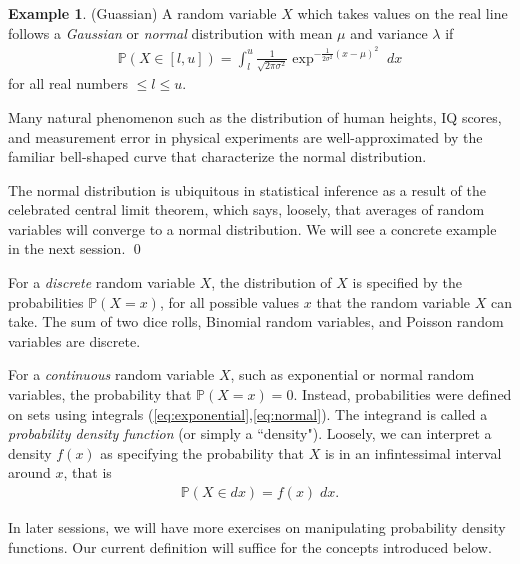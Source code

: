 \documentclass[11pt]{article}
\theoremstyle{definition}
\newtheorem{example}[theorem]{Example}
\renewcommand{\P}{\mathbb{P}}
\begin{document}
\begin{example}(Guassian)
A random variable $X$ which takes values on the real line follows a
\textit{Gaussian} or \textit{normal} distribution with mean $\mu$ and variance
$\lambda$ if
\begin{align}
  \P(X \in [l, u]) =
  \int_{l}^u \frac{1}{\sqrt{2\pi\sigma^2}}
  \exp^{-\frac{1}{2\sigma^2}(x - \mu)^2} \; dx
  \label{eq:normal}
\end{align}
for all real numbers $\leq l \leq u$.

Many natural phenomenon such as the distribution of human heights, IQ scores, and
measurement error in physical experiments are well-approximated by the familiar
bell-shaped curve that characterize the normal distribution.

The normal distribution is ubiquitous in statistical inference as a result of
the celebrated central limit theorem, which says, loosely, that averages
of random variables will converge to a normal distribution. We will see
a concrete example in the next session.
\qed
\end{example}

For a \textit{discrete} random variable $X$, the distribution of $X$ is specified
by the probabilities $\P(X = x)$, for all possible values $x$ that the random variable $X$
can take. The sum of two dice rolls, Binomial random variables, and Poisson random variables
are discrete.

For a \textit{continuous} random variable $X$, such as exponential or normal random variables,
the probability that $\P(X = x) = 0$. Instead, probabilities were defined on sets
using integrals (\ref{eq:exponential},\ref{eq:normal}).
The integrand is called a \textit{probability density function} (or simply a ``density"). Loosely,
we can interpret a density $f(x)$ as specifying the probability that $X$ is in an infintessimal
interval around $x$, that is
\begin{align*}
  \P(X \in dx) = f(x)\;dx.
\end{align*}

In later sessions, we will have more exercises on manipulating probability density functions.
Our current definition will suffice for the concepts introduced below.
\end{document}
